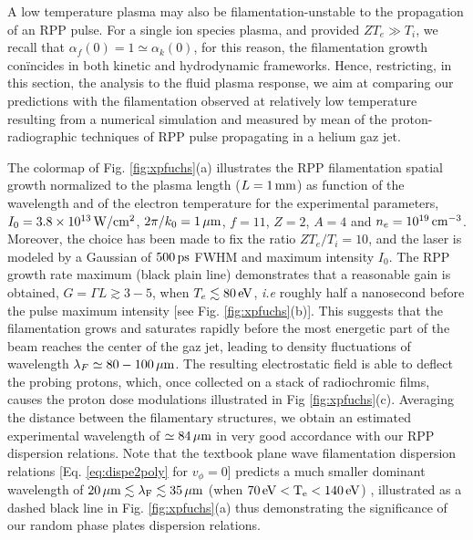 \documentclass[
 reprint,
 amsmath,amssymb,
 aps,
]{revtex4-1}
\begin{document}
A low temperature plasma may also be filamentation-unstable to the  propagation of an RPP pulse.
For a single ion species plasma, and provided $ZT_e\gg T_i$,   we recall that $\alpha_f(0)=1\simeq \alpha_k(0)$, for this reason, the filamentation growth con\"incides in both  kinetic and hydrodynamic frameworks. 
Hence, restricting, in this section, the analysis to the fluid plasma response, we aim at comparing our predictions with the filamentation observed at relatively low temperature resulting from a numerical simulation and measured by mean of the proton-radiographic techniques of RPP pulse propagating  in a helium gaz jet.

The colormap of Fig. \ref{fig:xpfuchs}(a) illustrates the RPP filamentation spatial  growth normalized to the plasma length ($L=1\,\rm mm$) as  function of the wavelength and of the electron temperature for the experimental parameters, $I_0=3.8\times 10^{13}\, \rm W/cm^2$, $2\pi/k_0=1\,\rm\mu m$, $f=11$, $Z=2$, $A=4$ and $n_e=10^{19} \,\rm cm^{-3}$. Moreover, the choice has been made to fix the ratio  $ZT_e/T_i=10$, and the laser is modeled by a Gaussian of $500\,\rm ps$ FWHM and maximum intensity $I_0$. The RPP growth rate maximum (black plain line) demonstrates that a reasonable gain is obtained,  $G=\Gamma L\gtrsim 3-5$, when $T_e\lesssim 80\, \rm eV$, \emph{i.e} roughly half a nanosecond before the pulse maximum intensity  [see Fig. \ref{fig:xpfuchs}(b)]. 
This suggests that the filamentation grows and saturates rapidly before the most energetic part of the beam reaches the center of the gaz jet, leading to  density fluctuations of wavelength   $\lambda_F \simeq 80-100 \,\rm\mu m$. The resulting electrostatic field is able to deflect the probing protons, which, once collected on a stack of radiochromic films, causes the proton dose modulations illustrated in Fig \ref{fig:xpfuchs}(c). Averaging the distance between the filamentary structures, we obtain an estimated experimental wavelength of $\simeq 84 \,\rm\mu m$ in very good accordance with our RPP dispersion relations. 
Note that the textbook plane wave filamentation dispersion relations [Eq. \eqref{eq:dispe2poly} for $v_\phi=0$] predicts a much smaller dominant wavelength of $20\, \rm{\mu m} \lesssim \lambda_F\lesssim  35\, \rm\mu m$ (when $70\, \rm{eV}<T_e<140\, \rm eV$) , illustrated as a dashed black line in Fig. \ref{fig:xpfuchs}(a) thus demonstrating the significance of our random phase plates dispersion relations. 
\end{document}
